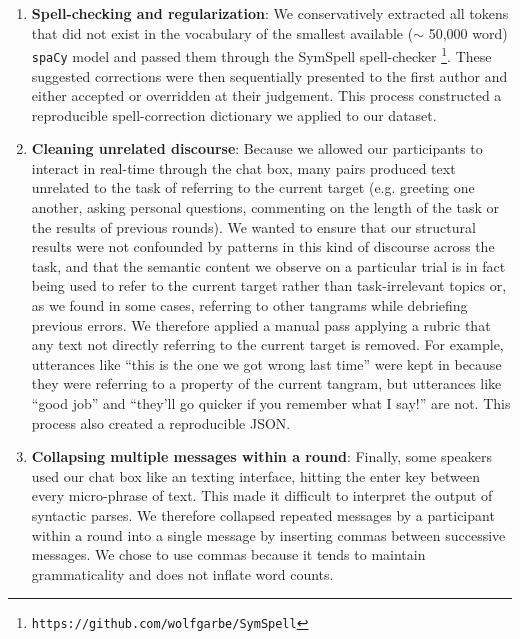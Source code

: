 \begin{enumerate}

\item \textbf{Spell-checking and regularization}: We conservatively extracted all tokens that did not exist in the vocabulary of the smallest available ($\sim$ 50,000 word) \texttt{spaCy} model and passed them through the SymSpell spell-checker \footnote{\texttt{https://github.com/wolfgarbe/SymSpell}}. These suggested corrections were then sequentially presented to the first author and either accepted or overridden at their judgement. This process constructed a reproducible spell-correction dictionary we applied to our dataset.

\item \textbf{Cleaning unrelated discourse}: Because we allowed our participants to interact in real-time through the chat box, many pairs produced text unrelated to the task of referring to the current target (e.g. greeting one another, asking personal questions, commenting on the length of the task or the results of previous rounds). We wanted to ensure that our structural results were not confounded by patterns in this kind of discourse across the task, and that the semantic content we observe on a particular trial is in fact being used to refer to the current target rather than task-irrelevant topics or, as we found in some cases, referring to other tangrams while debriefing previous errors. We therefore applied a manual pass applying a rubric that any text not directly referring to the current target is removed. For example, utterances like ``this is the one we got wrong last time'' were kept in because they were referring to a property of the current tangram, but utterances like ``good job'' and ``they'll go quicker if you remember what I say!'' are not. This process also created a reproducible JSON.

\item \textbf{Collapsing multiple messages within a round}: Finally, some speakers used our chat box like an texting interface, hitting the enter key between every micro-phrase of text. This made it difficult to interpret the output of syntactic parses. We therefore collapsed repeated messages by a participant within a round into a single message by inserting commas between successive messages. We chose to use commas because it tends to maintain grammaticality and does not inflate word counts.

\end{enumerate}


